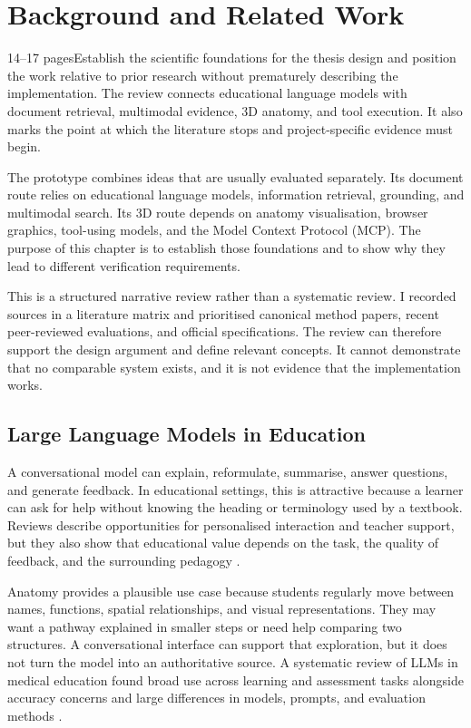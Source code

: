 \chapter{Background and Related Work}
\label{chap:background}

\begin{chapterplan}{14--17 pages}{Establish the scientific foundations for the thesis design and position the work relative to prior research without prematurely describing the implementation.}
The review connects educational language models with document retrieval, multimodal evidence, 3D anatomy, and tool execution. It also marks the point at which the literature stops and project-specific evidence must begin.
\end{chapterplan}

The prototype combines ideas that are usually evaluated separately. Its document route relies on educational language models, information retrieval, grounding, and multimodal search. Its 3D route depends on anatomy visualisation, browser graphics, tool-using models, and the Model Context Protocol (MCP). The purpose of this chapter is to establish those foundations and to show why they lead to different verification requirements.

This is a structured narrative review rather than a systematic review. I recorded sources in a literature matrix and prioritised canonical method papers, recent peer-reviewed evaluations, and official specifications. The review can therefore support the design argument and define relevant concepts. It cannot demonstrate that no comparable system exists, and it is not evidence that the implementation works.

\section{Large Language Models in Education}
\label{sec:llms-education}

A conversational model can explain, reformulate, summarise, answer questions, and generate feedback. In educational settings, this is attractive because a learner can ask for help without knowing the heading or terminology used by a textbook. Reviews describe opportunities for personalised interaction and teacher support, but they also show that educational value depends on the task, the quality of feedback, and the surrounding pedagogy \parencite{kasneci2023}.

Anatomy provides a plausible use case because students regularly move between names, functions, spatial relationships, and visual representations. They may want a pathway explained in smaller steps or need help comparing two structures. A conversational interface can support that exploration, but it does not turn the model into an authoritative source. A systematic review of LLMs in medical education found broad use across learning and assessment tasks alongside accuracy concerns and large differences in models, prompts, and evaluation methods \parencite{lucas2024medicaleducation}.

